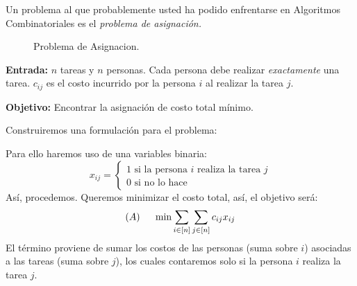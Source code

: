 \begin{eje} Un problema al que probablemente usted ha podido enfrentarse en Algoritmos Combinatoriales es el \emph{problema de asignación.}

\begin{figure}[thb]
\centering
{}
\caption{Problema de Asignacion.}
\label{fig:prob_asign}
\end{figure}

\textbf{Entrada:} $n$ tareas y $n$ personas. Cada persona debe realizar \emph{exactamente} una tarea. $c_{ij}$ es el costo incurrido por la persona $i$ al realizar la tarea $j$.

\textbf{Objetivo:} Encontrar la asignación de costo total mínimo.



Construiremos una formulación para el problema:

Para ello haremos uso de una variables binaria:
$$x_{ij}=\begin{cases}1\text{ si la persona } i\text{ realiza la tarea }j\\
0\text{ si no lo hace}
\end{cases}$$
Así, procedemos. Queremos minimizar el costo total, así, el objetivo será:
$$\text{(}A\text{)}\hspace{0.5cm} \min \sum_{i\in[n]}\sum_{j\in [n]}c_{ij} x_{ij}$$
El término proviene de sumar los costos de las personas (suma sobre $i$) asociadas a las tareas (suma sobre $j$), los cuales contaremos solo si la persona $i$ realiza la tarea $j$.


\end{eje}
